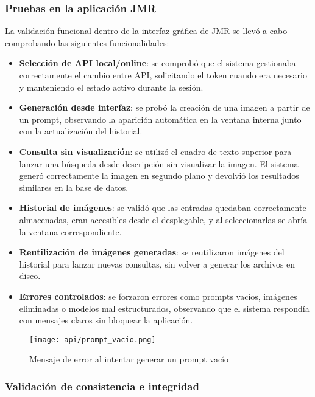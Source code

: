 \subsubsection{Pruebas en la aplicación JMR}

La validación funcional dentro de la interfaz gráfica de JMR se llevó a cabo comprobando las siguientes funcionalidades:

\begin{itemize}
    \item \textbf{Selección de API local/online}: se comprobó que el sistema gestionaba correctamente el cambio entre API, solicitando el token cuando era necesario y manteniendo el estado activo durante la sesión.

    \item \textbf{Generación desde interfaz}: se probó la creación de una imagen a partir de un prompt, observando la aparición automática en la ventana interna junto con la actualización del historial.

    \item \textbf{Consulta sin visualización}: se utilizó el cuadro de texto superior para lanzar una búsqueda desde descripción sin visualizar la imagen. El sistema generó correctamente la imagen en segundo plano y devolvió los resultados similares en la base de datos.

    \item \textbf{Historial de imágenes}: se validó que las entradas quedaban correctamente almacenadas, eran accesibles desde el desplegable, y al seleccionarlas se abría la ventana correspondiente.

    \item \textbf{Reutilización de imágenes generadas}: se reutilizaron imágenes del historial para lanzar nuevas consultas, sin volver a generar los archivos en disco.

    \item \textbf{Errores controlados}: se forzaron errores como prompts vacíos, imágenes eliminadas o modelos mal estructurados, observando que el sistema respondía con mensajes claros sin bloquear la aplicación.
\end{itemize}

\begin{figure}[H]
    \centering
    \texttt{[image: api/prompt\_vacio.png]}
    \caption{Mensaje de error al intentar generar un prompt vacío}
\end{figure}

\subsubsection{Validación de consistencia e integridad}


